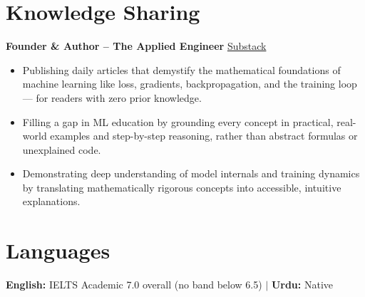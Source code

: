 \documentclass[10.5pt,a4paper]{article}
\begin{document}
\section*{Knowledge Sharing}

\noindent\textbf{Founder \& Author -- The Applied Engineer}
\hfill
\href{https://theappliedengineer.substack.com/}{Substack}

\begin{itemize}
    \item Publishing daily articles that demystify the mathematical foundations of machine learning like loss, gradients, backpropagation, and the training loop — for readers with zero prior knowledge.
    \item Filling a gap in ML education by grounding every concept in practical, real-world examples and step-by-step reasoning, rather than abstract formulas or unexplained code.
    \item Demonstrating deep understanding of model internals and training dynamics by translating mathematically rigorous concepts into accessible, intuitive explanations.
\end{itemize}


\section*{Languages}

\noindent\textbf{English:} IELTS Academic 7.0 overall (no band below 6.5)
\quad $\vert$ \quad
\noindent\textbf{Urdu:} Native
\end{document}
